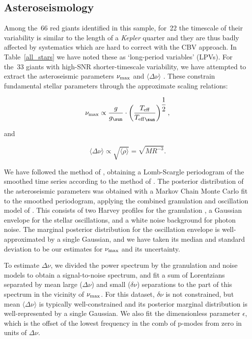 \documentclass[modern]{aastex62}
\newcommand{\numax}{\mbox{$\nu_{\rm max}$}\xspace}
\newcommand{\Dnu}{\mbox{$\Delta \nu$}\xspace}
\newcommand{\dnu}{\mbox{$\delta \nu$}\xspace}
\newcommand{\teff}{\mbox{$T_{\rm eff}$}\xspace}
\newcommand{\kepler}{\textit{Kepler}\xspace}
\begin{document}
\subsection{Asteroseismology}
\label{asteroseismology}

Among the~66 red giants identified in this sample, for~22 the timescale of their variability is similar to the length of a \kepler quarter and they are thus badly affected by systematics which are hard to correct with the CBV approach. In Table~\ref{all_stars} we have noted these as `long-period variables' (LPVs). For the~33 giants with high-SNR shorter-timescale variability, we have attempted to extract the asteroseismic parameters \numax and $\langle \Dnu \rangle$ \citep{KB95,2013ARA&A..51..353C}. These constrain fundamental stellar parameters through the approximate scaling relations: 

\begin{equation}
\label{scaling}
\numax \propto \dfrac{g}{g_{\sun}} \cdot \left(\dfrac{\teff}{\teff_{\sun}}\right)^{\dfrac{1}{2}},
\end{equation}

and

\begin{equation}
\label{Dnuscaling}
\langle \Dnu \rangle \propto \sqrt{\langle \rho \rangle} = \sqrt{M {R}^{-3}}.
\end{equation}

We have followed the method of \citet{2016AN....337..774D}, obtaining a Lomb-Scargle periodogram of the smoothed time series according to the method of \citet{2011MNRAS.414L...6G}. The posterior distribution of the asteroseismic parameters was obtained with a Markov Chain Monte Carlo fit to the smoothed periodogram, applying the combined granulation and oscillation model of \citet{2014A&A...570A..41K}. This consists of two Harvey profiles for the granulation \citep{1985ESASP.235..199H}, a Gaussian envelope for the stellar oscillations, and a white noise background for photon noise. The marginal posterior distribution for the oscillation envelope is well-approximated by a single Gaussian, and we have taken its median and standard deviation to be our estimates for \numax and its uncertainty.

To estimate \Dnu, we divided the power spectrum by the granulation and noise models to obtain a signal-to-noise spectrum, and fit a sum of Lorentzians separated by mean large (\Dnu) and small (\dnu) separations to the part of this spectrum in the vicinity of \numax. For this dataset, \dnu is not constrained, but mean $\langle \Dnu \rangle$ is typically well-constrained and its posterior marginal distribution is well-represented by a single Gaussian. We also fit the dimensionless parameter $\epsilon$, which is the offset of the lowest frequency in the comb of p-modes from zero in units of $\Dnu$.
\end{document}
